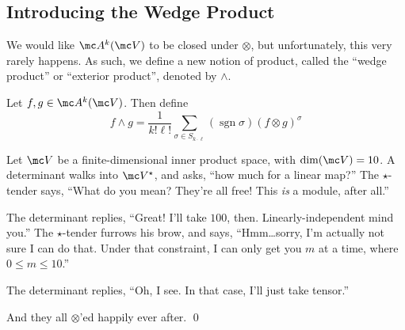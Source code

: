 \documentclass{fkbook}
\theoremstyle{snazzydefinition}
\DeclareMathOperator{\sgn}{sgn}
\begin{document}
  \subsection{Introducing the Wedge Product}
  We would like $\mc A^k(\mc V)$ to be closed under $\otimes$, but
  unfortunately, this very rarely happens. As such, we define a new
  notion of product, called the ``wedge product'' or ``exterior
  product'', denoted by $\wedge$.
  \begin{definition}
    Let $f,g \in \mc A^k(\mc V)$. Then define
    \[
      f \wedge g = \frac{1}{k!\ell!} \sum_{\sigma \in S_{k \cdot
          \ell}} (\sgn \sigma) (f \otimes g)^\sigma
    \]
  \end{definition}
  \begin{joke}
    Let $\mc V$ be a finite-dimensional inner product space, with
    $\dim(\mc V) = 10$. A determinant walks into $\mc V^\star$, and
    asks, ``how much for a linear map?'' The $\star$-tender says,
    ``What do you mean? They're all free! This \emph{is} a module,
    after all.''

    The determinant replies, ``Great! I'll take $100$, then.
    Linearly-independent mind you.'' The $\star$-tender furrows his
    brow, and says, ``Hmm\ldots sorry, I'm actually not sure I can do
    that. Under that constraint, I can only get you $m$ at a time,
    where $0 \leq m \leq 10$.''

    The determinant replies, ``Oh, I see. In that case, I'll just take
    tensor.''

    And they all $\otimes$'ed happily ever after. \qed
  \end{joke}
\end{document}

